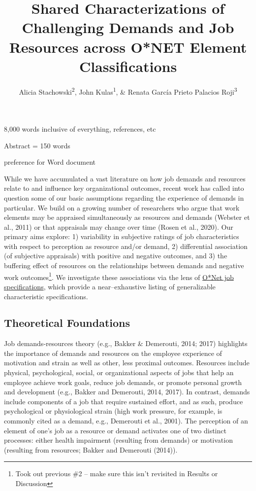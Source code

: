 \documentclass[
  man]{apa7}
\title{Shared Characterizations of Challenging Demands and Job Resources across O*NET Element Classifications}
\author{Alicia Stachowski\textsuperscript{2}, John Kulas\textsuperscript{1}, \& Renata García Prieto Palacios Roji\textsuperscript{3}}
\date{}
\affiliation{\vspace{0.5cm}\textsuperscript{1} eRg\\\textsuperscript{2} University of Wisconsin - Stout\\\textsuperscript{3} PepsiCo}
\begin{document}
\maketitle

8,000 words inclusive of everything, references, etc

Abstract = 150 words

preference for Word document

While we have accumulated a vast literature on how job demands and resources relate to and influence key organizational outcomes, recent work has called into question some of our basic assumptions regarding the experience of demands in particular. We build on a growing number of researchers who argue that work elements may be appraised simultaneously as resources and demands (Webster et al., 2011) or that appraisals may change over time (Rosen et al., 2020). Our primary aims explore: 1) variability in subjective ratings of job characteristics with respect to perception as resource and/or demand, 2) differential association (of subjective appraisals) with positive and negative outcomes, and 3) the buffering effect of resources on the relationships between demands and negative work outcomes\footnote{Took out previous \#2 -- make sure this isn't revisited in Results or Discussion}. We investigate these associations via the lens of \href{https://www.onetcenter.org/content.html}{O*Net job specifications}, which provide a near--exhaustive listing of generalizable characteristic specifications.

\hypertarget{theoretical-foundations}{%
\subsection{Theoretical Foundations}\label{theoretical-foundations}}

Job demands-resources theory (e.g., Bakker \& Demerouti, 2014; 2017) highlights the importance of demands and resources on the employee experience of motivation and strain as well as other, less proximal outcomes. Resources include physical, psychological, social, or organizational aspects of jobs that help an employee achieve work goals, reduce job demands, or promote personal growth and development (e.g., Bakker and Demerouti, 2014, 2017). In contrast, demands include components of a job that require sustained effort, and as such, produce psychological or physiological strain (high work pressure, for example, is commonly cited as a demand, e.g., Demerouti et al., 2001). The perception of an element of one's job as a resource or demand activates one of two distinct processes: either health impairment (resulting from demands) or motivation (resulting from resources; Bakker and Demerouti (2014)).
\end{document}
